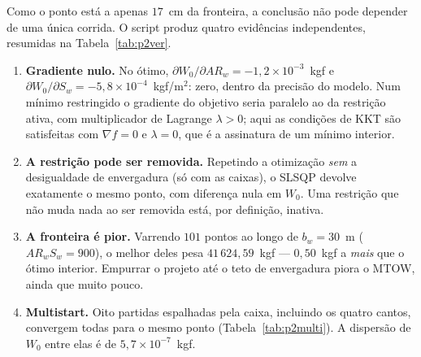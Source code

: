 Como o ponto está a apenas $17$~cm da fronteira, a conclusão não pode
depender de uma única corrida. O script
 produz quatro evidências independentes,
resumidas na Tabela~\ref{tab:p2ver}.

\begin{table}[H]
\centering
\caption{Evidências de que o ótimo da aeronave padrão é interior.}
\label{tab:p2ver}
\small

\end{table}

\begin{enumerate}
\item \textbf{Gradiente nulo.} No ótimo,
      $\partial W_0/\partial AR_w = -1{,}2\times 10^{-3}$~kgf e
      $\partial W_0/\partial S_w = -5{,}8\times 10^{-4}$~kgf/m$^2$:
      zero, dentro da precisão do modelo. Num mínimo restringido o
      gradiente do objetivo seria paralelo ao da restrição ativa, com
      multiplicador de Lagrange $\lambda > 0$; aqui as condições de KKT
      são satisfeitas com $\nabla f = 0$ e $\lambda = 0$, que é a
      assinatura de um mínimo interior.

\item \textbf{A restrição pode ser removida.} Repetindo a otimização
      \emph{sem} a desigualdade de envergadura (só com as caixas),
      o SLSQP devolve exatamente o mesmo ponto, com diferença nula em
      $W_0$. Uma restrição que não muda nada ao ser removida está,
      por definição, inativa.

\item \textbf{A fronteira é pior.} Varrendo $101$ pontos ao longo de
      $b_w = 30$~m ($AR_w S_w = 900$), o melhor deles pesa
      $41\,624{,}59$~kgf --- $0{,}50$~kgf a \emph{mais} que o ótimo
      interior. Empurrar o projeto até o teto de envergadura piora o
      MTOW, ainda que muito pouco.

\item \textbf{Multistart.} Oito partidas espalhadas pela caixa,
      incluindo os quatro cantos, convergem todas para o mesmo ponto
      (Tabela~\ref{tab:p2multi}). A dispersão de $W_0$ entre elas é de
      $5{,}7\times 10^{-7}$~kgf.
\end{enumerate}

\begin{table}[H]
\centering
\caption{\emph{Multistart}: oito pontos de partida na caixa de projeto.}
\label{tab:p2multi}
\small

\end{table}

